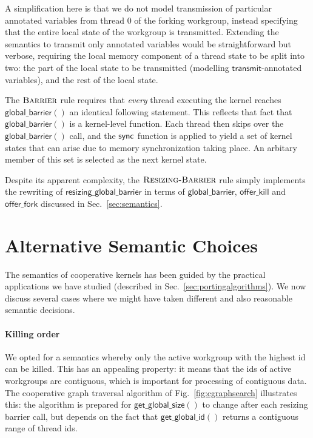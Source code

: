 \documentclass[numbers,nocopyrightspace,10pt]{sigplanconf}
\newcommand{\myfig}{Fig.~}
\newcommand{\mysec}{Sec.~}
\newcommand{\transmit}{\mathsf{transmit}}
\newcommand{\offerfork}{\mathsf{offer\_fork}}
\newcommand{\offerkill}{\mathsf{offer\_kill}}
\newcommand{\globalbarrier}{\mathsf{global\_barrier}}
\newcommand{\resizingglobalbarrier}{\mathsf{resizing\_global\_barrier}}
\newcommand{\getglobalid}{\mathsf{get\_global\_id}}
\newcommand{\getglobalsize}{\mathsf{get\_global\_size}}
\begin{document}
A simplification here is that we do not model transmission of
particular annotated variables from thread 0 of the forking workgroup,
instead specifying that the entire local state of the workgroup is
transmitted.  Extending the semantics to transmit only annotated
variables would be straightforward but verbose, requiring the local
memory component of a thread state to be split into two: the part of
the local state to be transmitted (modelling $\transmit$-annotated
variables), and the rest of the local state.

The $\textsc{Barrier}$ rule requires that \emph{every} thread
executing the kernel reaches $\globalbarrier()$ an identical following
statement.  This reflects that fact that $\globalbarrier()$ is a
kernel-level function.  Each thread then skips over the
$\globalbarrier()$ call, and the $\mathsf{sync}$ function is applied to yield
a set of kernel states that can arise due to memory synchronization
taking place.  An arbitary member of this set is selected as the next
kernel state.

Despite its apparent complexity, the $\textsc{Resizing-Barrier}$ rule simply implements the rewriting of $\resizingglobalbarrier$ in terms of $\globalbarrier$, $\offerkill$ and $\offerfork$ discussed in \mysec\ref{sec:semantics}.


\section{Alternative Semantic Choices}\label{appendix:semanticalternatives}

The semantics of cooperative kernels has been guided by the practical
applications we have studied (described in
\mysec\ref{sec:portingalgorithms}).  We now discuss several cases
where we might have taken different and also reasonable semantic
decisions.

\paragraph{Killing order}

We opted for a semantics whereby only the active workgroup with the
highest id can be killed.  This has an appealing property: it means
that the ids of active workgroups are contiguous, which is important
for processing of contiguous data.  The cooperative graph traversal
algorithm of \myfig\ref{fig:cgraphsearch} illustrates this: the
algorithm is prepared for $\getglobalsize()$ to change after each
resizing barrier call, but depends on the fact that $\getglobalid()$
returns a contiguous range of thread ids.
\end{document}
